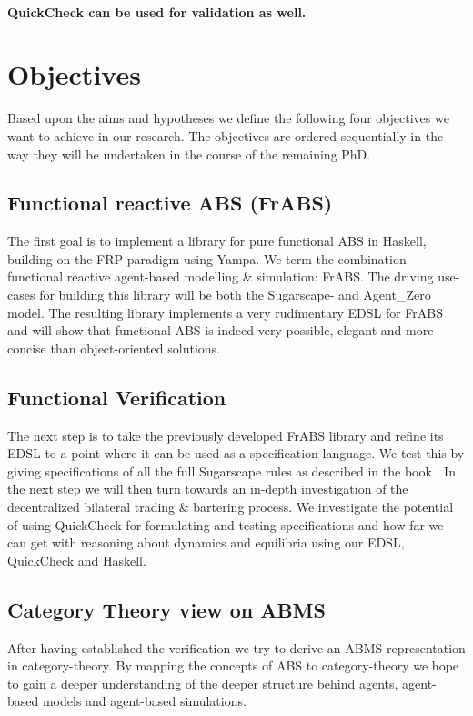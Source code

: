 \paragraph{QuickCheck can be used for validation as well.}



\section{Objectives}
Based upon the aims and hypotheses we define the following four objectives we want to achieve in our research. The objectives are ordered sequentially in the way they will be undertaken in the course of the remaining PhD.

\subsection{Functional reactive ABS (FrABS)}
The first goal is to implement a library for pure functional ABS in Haskell, building on the FRP paradigm using Yampa. We term the combination functional reactive agent-based modelling \& simulation: FrABS. The driving use-cases for building this library will be both the Sugarscape- and Agent\_Zero model. The resulting library implements a very rudimentary EDSL for FrABS and will show that functional ABS is indeed very possible, elegant and more concise than object-oriented solutions.

\subsection{Functional Verification}
The next step is to take the previously developed FrABS library and refine its EDSL to a point where it can be used as a specification language. We test this by giving specifications of all the full Sugarscape rules as described in the book \cite{epstein_growing_1996}. In the next step we will then turn towards an in-depth investigation of the decentralized bilateral trading \& bartering process. We investigate the potential of using QuickCheck for formulating and testing specifications and how far we can get with reasoning about dynamics and equilibria using our EDSL, QuickCheck and Haskell.

\subsection{Category Theory view on ABMS}
After having established the verification we try to derive an ABMS representation in category-theory. By mapping the concepts of ABS to category-theory we hope to gain a deeper understanding of the deeper structure behind agents, agent-based models and agent-based simulations.

